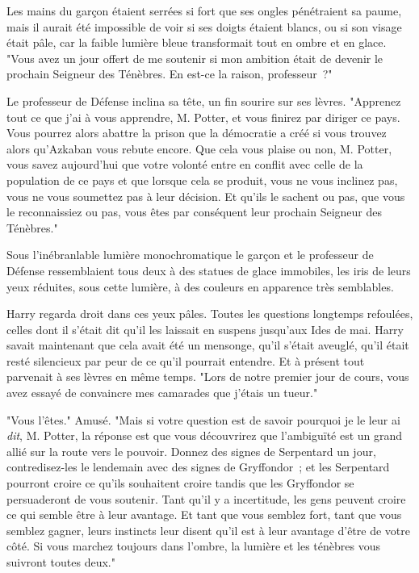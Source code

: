 Les mains du garçon étaient serrées si fort que ses ongles pénétraient sa paume, mais il aurait été impossible de voir si ses doigts étaient blancs, ou si son visage était pâle, car la faible lumière bleue transformait tout en ombre et en glace. "Vous avez un jour offert de me soutenir si mon ambition était de devenir le prochain Seigneur des Ténèbres. En est-ce la raison, professeur~?"

Le professeur de Défense inclina sa tête, un fin sourire sur ses lèvres. "Apprenez tout ce que j'ai à vous apprendre, M. Potter, et vous finirez par diriger ce pays. Vous pourrez alors abattre la prison que la démocratie a créé si vous trouvez alors qu'Azkaban vous rebute encore. Que cela vous plaise ou non, M. Potter, vous savez aujourd'hui que votre volonté entre en conflit avec celle de la population de ce pays et que lorsque cela se produit, vous ne vous inclinez pas, vous ne vous soumettez pas à leur décision. Et qu'ils le sachent ou pas, que vous le reconnaissiez ou pas, vous êtes par conséquent leur prochain Seigneur des Ténèbres."

Sous l'inébranlable lumière monochromatique le garçon et le professeur de Défense ressemblaient tous deux à des statues de glace immobiles, les iris de leurs yeux réduites, sous cette lumière, à des couleurs en apparence très semblables.

Harry regarda droit dans ces yeux pâles. Toutes les questions longtemps refoulées, celles dont il s'était dit qu'il les laissait en suspens jusqu'aux Ides de mai. Harry savait maintenant que cela avait été un mensonge, qu'il s'était aveuglé, qu'il était resté silencieux par peur de ce qu'il pourrait entendre. Et à présent tout parvenait à ses lèvres en même temps. "Lors de notre premier jour de cours, vous avez essayé de convaincre mes camarades que j'étais un tueur."

"Vous l'êtes." Amusé. "Mais si votre question est de savoir pourquoi je le leur ai \emph{dit}, M. Potter, la réponse est que vous découvrirez que l'ambiguïté est un grand allié sur la route vers le pouvoir. Donnez des signes de Serpentard un jour, contredisez-les le lendemain avec des signes de Gryffondor~; et les Serpentard pourront croire ce qu'ils souhaitent croire tandis que les Gryffondor se persuaderont de vous soutenir. Tant qu'il y a incertitude, les gens peuvent croire ce qui semble être à leur avantage. Et tant que vous semblez fort, tant que vous semblez gagner, leurs instincts leur disent qu'il est à leur avantage d'être de votre côté. Si vous marchez toujours dans l'ombre, la lumière et les ténèbres vous suivront toutes deux."

